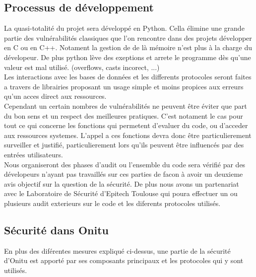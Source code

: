 \subsection{Processus de développement}

La quasi-totalité du projet sera développé en Python. Cella élimine une grande partie des vulnérabilités classiques que l'on rencontre dans des projets développer en C ou en C++. Notament la gestion de de là mémoire n'est plus à la charge du dévelopeur. De plus python lève des exeptions et arrete le programme dès qu'une valeur est mal utilisé. (overflows, casts incorect, ...)\\
Les interactions avec les bases de données et les differents protocoles seront faites a travers de librairies proposant un usage simple et moins propices aux erreurs qu'un acces direct aux ressources.\\
Cependant un certain nombres de vulnérabilités ne peuvent être éviter que part du bon sens et un respect des meilleures pratiques. C'est notament le cas pour tout ce qui concerne les fonctions qui permetent d'evaluer du code, ou d'acceder aux ressources systemes. L'appel a ces fonctions devra donc être particulierement surveiller et justifié, particulierement lors qu'ils peuvent être influencés par des entrées utilisateurs.\\
Nous organiseront des phases d'audit ou l'ensemble du code sera vérifié par des dévelopeurs n'ayant pas travaillés sur ces parties de facon à avoir un deuxieme avis objectif sur la question de la sécurité. De plus nous avons un partenariat avec le Laboratoire de Sécurité d'Epitech Toulouse qui poura effectuer un ou plusieurs audit exterieurs sur le code et les diferents protocoles utilisés.

\subsection{Sécurité dans Onitu}

En plus des diférentes mesures expliqué ci-dessus, une partie de la sécurité d'Onitu est apporté par ses composants principaux et les protocoles qui y sont utilisés.

